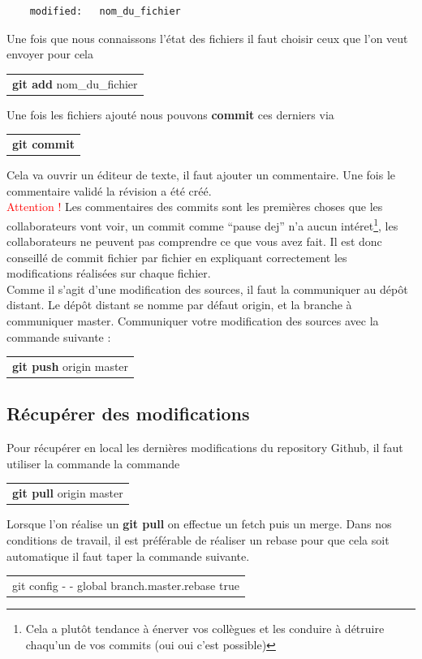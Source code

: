 \documentclass[a4paper,10pt]{article}
\begin{document}
\begin{spacing}{1.5}
\begin{lstlisting}
    modified:   nom_du_fichier
\end{lstlisting}
Une fois que nous connaissons l'état des fichiers il faut choisir ceux que l'on veut envoyer
pour cela
\begin{center}
  \begin{tabular}{c}
    \rowcolor{lightgray!50!white}
      \textbf{git add} nom\_du\_fichier
  \end{tabular}
\end{center}
Une fois les fichiers ajouté nous pouvons \textbf{commit} ces derniers via
\begin{center}
  \begin{tabular}{c}
    \rowcolor{lightgray!50!white}
      \textbf{git commit}
  \end{tabular}
\end{center}
Cela va ouvrir un éditeur de texte, il faut ajouter un commentaire. Une fois le
commentaire validé la révision a été créé.\\ \textcolor{red}{Attention !} Les
commentaires des commits sont les premières choses que les collaborateurs vont
voir, un commit comme ``pause dej'' n'a aucun intéret\footnote{Cela a plutôt
  tendance à énerver vos collègues et les conduire à détruire chaqu'un de vos
  commits (oui oui c'est possible)}, les collaborateurs ne peuvent pas
comprendre ce que vous avez fait. Il est donc conseillé de commit fichier par
fichier en expliquant correctement les modifications réalisées sur chaque
fichier.\\
Comme il s'agit d'une modification des sources, il faut la communiquer au dépôt
distant. Le dépôt distant se nomme par défaut origin, et la branche à
communiquer master. Communiquer votre modification des sources avec la commande
suivante :
\begin{center}
  \begin{tabular}{c}
    \rowcolor{lightgray!50!white}
      \textbf{git push} origin master
  \end{tabular}
\end{center}

\newpage
\subsection*{Récupérer des modifications}
Pour récupérer en local les dernières modifications du repository Github, il
faut utiliser la commande la commande
\begin{center}
  \begin{tabular}{c}
    \rowcolor{lightgray!50!white}
      \textbf{git pull} origin master
  \end{tabular}
\end{center}
Lorsque l'on réalise un \textbf{git pull} on effectue un fetch puis
un merge. Dans nos conditions de travail, il est préférable de
réaliser un rebase pour que cela soit automatique il faut taper la commande
suivante.
\begin{center}
  \begin{tabular}{c}
    \rowcolor{lightgray!50!white}
      git config - - global branch.master.rebase true
  \end{tabular}
\end{center}


\end{spacing}
\end{document}
